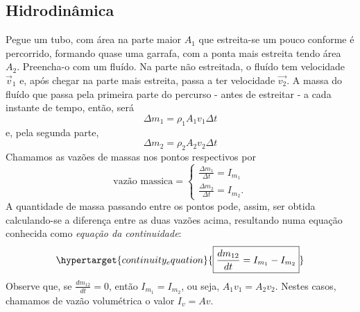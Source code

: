 \documentclass[PhysicsII/physicsII_notes.tex]{subfiles}
\begin{document}
\subsection{Hidrodinâmica}
Pegue um tubo, com área na parte maior \(A_{1}\) que estreita-se um pouco conforme é percorrido, formando quase uma garrafa, com a ponta mais estreita tendo área \(A_{2}\).
Preencha-o com um fluído. Na parte não estreitada, o fluído tem velocidade \(\vec{v}_{1}\) e, após chegar na parte mais estreita, passa a ter velocidade \(\vec{v_{2}}\).
A massa do fluído que passa pela primeira parte do percurso - antes de estreitar - a cada instante de tempo, então, será
\[
	\Delta m_{1} = \rho_{1}A_{1}v_{1}\Delta t
\]
e, pela segunda parte,
\[
	\Delta m_{2} = \rho_{2}A_{2}v_{2}\Delta t
\]
Chamamos as vazões de massas nos pontos respectivos por
\[
	\text{vazão massica} = \left\{\begin{array}{ll}
		\frac{\Delta m_{1}}{\Delta t} = I_{m_{1}} \\
		\frac{\Delta m_{2}}{\Delta t} = I_{m_{2}}.
	\end{array}\right.
\]
A quantidade de massa passando entre os pontos pode, assim, ser obtida calculando-se a diferença entre as duas vazões acima,
resultando numa equação conhecida como \textit{equação da continuidade}:
\[
	\hypertarget{continuity_equation}{\boxed{\frac{dm_{12}}{dt} = I_{m_{1}}-I_{m_{2}}}}
\]
Observe que, se \(\frac{dm_{12}}{dt} = 0\), então \(I_{m_{1}} = I_{m_{2}}\), ou seja, \(A_{1}v_{1}=A_{2}v_{2}\). Nestes casos, chamamos de vazão
volumétrica o valor \(I_{v}=Av\).
\end{document}
